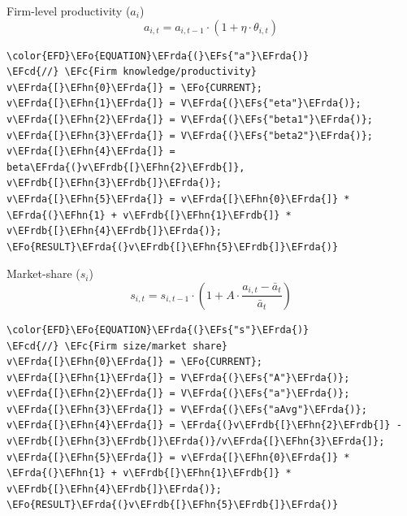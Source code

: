 \documentclass[bigger,aspectratio=169]{beamer}
\newcommand{\EFc}[1]{\textcolor{EFc}{#1}} %
\newcommand{\EFcd}[1]{\textcolor{EFcd}{#1}} %
\newcommand{\EFs}[1]{\textcolor{EFs}{#1}} %
\newcommand{\EFo}[1]{\textcolor{EFo}{#1}} %
\newcommand{\EFhn}[1]{\textcolor{EFhn}{\textbf{#1}}} %
\newcommand{\EFrda}[1]{\textcolor{EFrda}{#1}} %
\newcommand{\EFrdb}[1]{\textcolor{EFrdb}{#1}} %
\begin{document}
\begin{frame}[label={sec:org966ab6c},fragile]{Firm-level productivity (\(a_{i}\))}
 \begin{equation}
a_{i,t} = a_{i,t-1}\cdot (1 + \eta\cdot\theta_{i,t})
\end{equation}

\begin{Code}
\begin{Verbatim}
\color{EFD}\EFo{EQUATION}\EFrda{(}\EFs{"a"}\EFrda{)}
\EFcd{//} \EFc{Firm knowledge/productivity}
v\EFrda{[}\EFhn{0}\EFrda{]} = \EFo{CURRENT};
v\EFrda{[}\EFhn{1}\EFrda{]} = V\EFrda{(}\EFs{"eta"}\EFrda{)};
v\EFrda{[}\EFhn{2}\EFrda{]} = V\EFrda{(}\EFs{"beta1"}\EFrda{)};
v\EFrda{[}\EFhn{3}\EFrda{]} = V\EFrda{(}\EFs{"beta2"}\EFrda{)};
v\EFrda{[}\EFhn{4}\EFrda{]} = beta\EFrda{(}v\EFrdb{[}\EFhn{2}\EFrdb{]}, v\EFrdb{[}\EFhn{3}\EFrdb{]}\EFrda{)};
v\EFrda{[}\EFhn{5}\EFrda{]} = v\EFrda{[}\EFhn{0}\EFrda{]} * \EFrda{(}\EFhn{1} + v\EFrdb{[}\EFhn{1}\EFrdb{]} * v\EFrdb{[}\EFhn{4}\EFrdb{]}\EFrda{)};
\EFo{RESULT}\EFrda{(}v\EFrdb{[}\EFhn{5}\EFrdb{]}\EFrda{)}
\end{Verbatim}
\end{Code}
\end{frame}
\begin{frame}[label={sec:org4959863},fragile]{Market-share (\(s_{i}\))}
 \begin{equation}
s_{i,t} = s_{i,t-1} \cdot \left( 1 + A\cdot\frac{a_{i,t} - \bar{a}_{t}}{\bar{a}_{t}}\right)
\end{equation}


\begin{Code}
\begin{Verbatim}
\color{EFD}\EFo{EQUATION}\EFrda{(}\EFs{"s"}\EFrda{)}
\EFcd{//} \EFc{Firm size/market share}
v\EFrda{[}\EFhn{0}\EFrda{]} = \EFo{CURRENT};
v\EFrda{[}\EFhn{1}\EFrda{]} = V\EFrda{(}\EFs{"A"}\EFrda{)};
v\EFrda{[}\EFhn{2}\EFrda{]} = V\EFrda{(}\EFs{"a"}\EFrda{)};
v\EFrda{[}\EFhn{3}\EFrda{]} = V\EFrda{(}\EFs{"aAvg"}\EFrda{)};
v\EFrda{[}\EFhn{4}\EFrda{]} = \EFrda{(}v\EFrdb{[}\EFhn{2}\EFrdb{]} - v\EFrdb{[}\EFhn{3}\EFrdb{]}\EFrda{)}/v\EFrda{[}\EFhn{3}\EFrda{]};
v\EFrda{[}\EFhn{5}\EFrda{]} = v\EFrda{[}\EFhn{0}\EFrda{]} * \EFrda{(}\EFhn{1} + v\EFrdb{[}\EFhn{1}\EFrdb{]} * v\EFrdb{[}\EFhn{4}\EFrdb{]}\EFrda{)};
\EFo{RESULT}\EFrda{(}v\EFrdb{[}\EFhn{5}\EFrdb{]}\EFrda{)}
\end{Verbatim}
\end{Code}
\end{frame}
\end{document}
